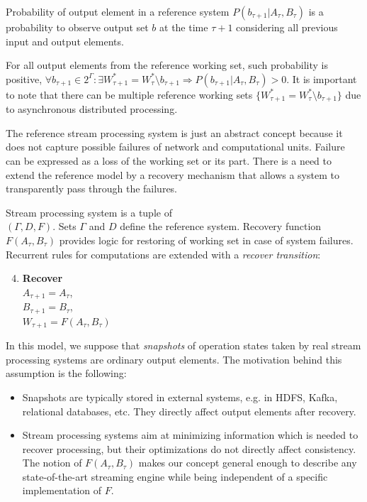 \begin{definition}{Probability of output element in a reference system}
$P(b_{\tau+1}|A_{\tau}, B_\tau)$ is a probability to observe output set $b$ at the time $\tau+1$ considering all previous input and output elements.
\end{definition}

For all output elements from the reference working set, such probability is positive, $\forall{b_{\tau+1} \in 2^{\Gamma}:\exists{W^{*}_{\tau+1}=W^{*}_{\tau}\setminus{b_{\tau+1}}}} \Rightarrow P(b_{\tau+1}|A_{\tau}, B_\tau) > 0$. It is important to note that there can be multiple reference working sets $\{W^{*}_{\tau+1}=W^{*}_{\tau}\setminus{b_{\tau+1}}\}$ due to asynchronous distributed processing. 

The reference stream processing system is just an abstract concept because it does not capture possible failures of network and computational units. Failure can be expressed as a loss of the working set or its part. There is a need to extend the reference model by a recovery mechanism that allows a system to transparently pass through the failures.

\begin{definition}{Stream processing system}
is a tuple of\\
$(\Gamma,D,F)$. Sets $\Gamma$ and $D$ define the reference system. Recovery function $F(A_\tau,B_\tau)$ provides logic for restoring of working set in case of system failures. Recurrent rules for computations are extended with a {\em recover transition}:
\begin{enumerate}
    \setcounter{enumi}{3}
    \item \textbf{Recover} \\  $A_{\tau + 1} = A_{\tau}$,\\ $B_{\tau+1}=B_{\tau}$, \\ $W_{\tau+1} = F(A_\tau,B_\tau)$
\end{enumerate}

\end{definition}

In this model, we suppose that {\em snapshots} of operation states taken by real stream processing systems are ordinary output elements. The motivation behind this assumption is the following:

\begin{itemize}
    \item Snapshots are typically stored in external systems, e.g. in HDFS, Kafka, relational databases, etc. They directly affect output elements after recovery.
    \item Stream processing systems aim at minimizing information which is needed to recover processing, but their optimizations do not directly affect consistency. The notion of $F(A_\tau,B_\tau)$ makes our concept general enough to describe any state-of-the-art streaming engine while being independent of a specific implementation of $F$.
\end{itemize}


